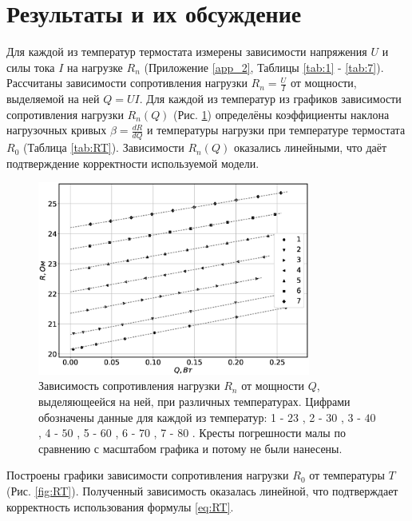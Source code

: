 \documentclass[12pt]{article}
\begin{document}
\section{Результаты и их обсуждение}
Для каждой из температур термостата измерены зависимости напряжения \(U\) и силы тока \(I\) на нагрузке \(R_n\) (Приложение \ref{app_2}, Таблицы \ref{tab:1} - \ref{tab:7}).
Рассчитаны зависимости сопротивления нагрузки \(R_n = \frac{U}{I}\) от мощности, выделяемой на ней \(Q = UI\).
Для каждой из температур из графиков зависимости сопротивления нагрузки \(R_n(Q)\) (Рис. \ref{fig:RQ}) определёны коэффициенты наклона нагрузочных кривых \(\beta = \frac{d R}{d Q}\) и 
температуры нагрузки при температуре термостата \(R_0\) (Таблица \ref{tab:RT}).
Зависимости \(R_n(Q)\) оказались линейными, что даёт подтверждение корректности используемой модели.
\begin{figure}[H]
    \centering
    \includegraphics[width=0.8\textwidth]{RQ.eps}
    \caption{Зависимость сопротивления нагрузки \(R_n\) от мощности \(Q\), выделяющеейся на ней, при различных температурах.
        Цифрами обозначены данные для каждой из температур: 
        1 - \(23\) \textcelsius, 2 - \(30\) \textcelsius, 3 - \(40\) \textcelsius, 4 - \(50\) \textcelsius, 5 - \(60\) \textcelsius, 6 - \(70\) \textcelsius, 7 - \(80\) \textcelsius. Кресты погрешности малы по сравнению с масштабом графика и потому не были нанесены.      }
    \label{fig:RQ}
\end{figure}
Построены графики зависимости сопротивления нагрузки \(R_0\) от температуры \(T\) (Рис. \ref{fig:RT}). Полученный зависимость оказалась линейной, что подтверждает корректность 
использования формулы \ref{eq:RT}.
\end{document}
